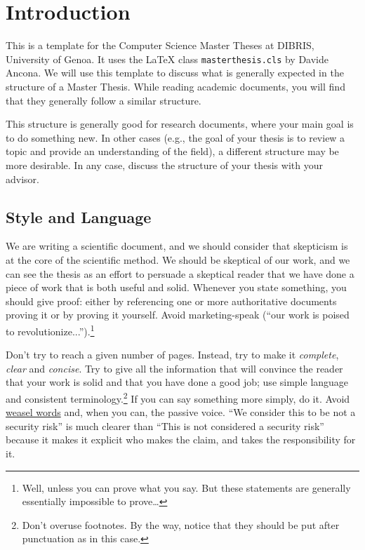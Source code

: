 \chapter{Introduction}
\label{sec:introduction}

This is a template for the Computer Science Master Theses at DIBRIS,
University of Genoa. It uses the \xspace{\LaTeX} class \texttt{masterthesis.cls} by
Davide Ancona. We will use this template to discuss what is generally expected in the
structure of a Master Thesis. While reading academic documents, you will find that
they generally follow a similar structure.

This structure is generally good for research documents, where your main goal is to do
something new. In other cases (e.g., the goal of your thesis is to review a topic and provide
an understanding of the field), a different structure may be more desirable. In any case,
discuss the structure of your thesis with your advisor.

\section{Style and Language}

We are writing a scientific document, and we should consider that skepticism
is at the core of the scientific method. We should be skeptical of our work, and
we can see the thesis as an effort to persuade a skeptical reader that we have done
a piece of work that is both useful and solid. Whenever you state something, you should give proof:
either by referencing one or more authoritative documents proving it or by proving it yourself.
Avoid marketing-speak (``our work is poised to revolutionize...'').\footnote{Well, unless you can
prove what you say. But these statements are generally essentially impossible to prove\ldots}

Don't try to reach a given number of pages. Instead, try to make it
\emph{complete}, \emph{clear} and \emph{concise}. Try to give all the information that will
convince the reader that your work is solid and that you have done a good job; use simple
language and consistent terminology.\footnote{Don't overuse footnotes. By the
way, notice that they should be put after punctuation as in this case.}
If you can say something more simply, do it. Avoid
\href{https://en.wikipedia.org/wiki/Weasel_word}{weasel words} and, when you can, the passive voice.
``We consider this to be not a security risk'' is much clearer than ``This is not considered a
security risk'' because it makes it explicit who makes the claim, and takes the responsibility for
it.

